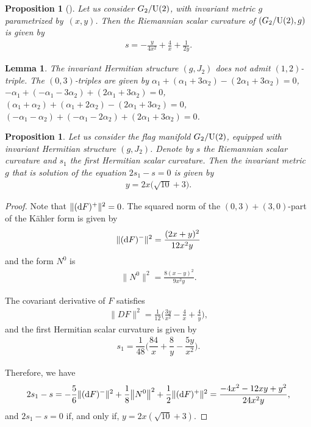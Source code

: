 \documentclass[10pt,a4paper]{amsart}
\numberwithin{equation}{section}
\newtheorem{Lemma}[Theorem]{Lemma}
\newtheorem{Proposition}[Theorem]{Proposition}
 { \theoremstyle{definition}
\newtheorem{Definition}[Theorem]{Definition}
\newtheorem{Question}[Theorem]{Question}
\newtheorem*{Notation}{Notation}
\newtheorem{Example}[Theorem]{Example}
\newtheorem{Remark}[Theorem]{Remark} }
\begin{document}
\begin{Proposition}[\cite{grego2}]
{\sloppy
Let us consider $G_{2}/{\rm U}(2)$, with invariant metric $g$ parametrized by~$(x,y)$. Then the Riemannian scalar curvature of $(G_{2}/{\rm U}(2),g)$ is given by
\begin{gather*}
s=-\frac{y}{4 x^2}+\frac{4}{x}+\frac{1}{2 y}.
\end{gather*}}
\end{Proposition}

\begin{Lemma}
The invariant Hermitian structure $(g, J_{2})$ does not admit $(1,2)$-triple. The $(0,3)$-triples are given by $\alpha_1+( \alpha_1+3\alpha_2) - ( 2\alpha_1+3\alpha_2)=0$, $-\alpha_1 + ( -\alpha_1-3\alpha_2)+(2\alpha_1+3\alpha_2)=0$, $(\alpha_1+\alpha_2) + ( \alpha_1+2\alpha_2)-(2\alpha_1+3\alpha_2)=0$, $( -\alpha_1-\alpha_2)+ ( -\alpha_1-2\alpha_2)+(2\alpha_1+3\alpha_2)=0$.
\end{Lemma}

\begin{Proposition}\label{prop-g2-j2}
Let us consider the flag manifold $G_{2}/{\rm U}(2)$, equipped with invariant Hermitian structure $(g, J_{2})$. Denote by $s$ the Riemannian scalar curvature and $s_1$ the first Hermitian scalar curvature. Then the invariant metric $g$ that is solution of the equation $2s_1-s=0$ is given by
 \begin{gather*}
y=2x\big(\sqrt{10} +3\big).
\end{gather*}
\end{Proposition}

\begin{proof}
Note that $\|({\rm d}F)^{+}\|^{2}=0$. The squared norm of the $(0,3)+(3,0)$-part of the K\"ahler form is given by
\begin{gather*}
\|({\rm d}F)^{-}\|^{2}=\frac{(2 x+y)^2}{12 x^2 y}
\end{gather*}
and the form $N^{0}$ is
\begin{gather*}
\big\|N^{0}\big\|^{2}=\frac{8 (x-y)^2}{9 x^2 y}.
\end{gather*}

The covariant derivative of $F$ satisfies
\begin{gather*}
\|DF\|^{2}=\frac{1}{12} \bigg(\frac{3 y}{x^2}-\frac{4}{x}+\frac{4}{y}\bigg),
\end{gather*}
and the first Hermitian scalar curvature is given by
\begin{gather*}
s_{1}=\dfrac{1}{48} \bigg(\dfrac{84}{x} + \dfrac{8}{y} - \dfrac{5 y}{x^2}\bigg).
\end{gather*}

Therefore, we have
\begin{align*}
2s_{1}-s=-\dfrac{5}{6}\|({\rm d}F)^{-}\|^{2}+\dfrac{1}{8}\big\|N^{0}\big\|^{2}+\dfrac{1}{2}\|({\rm d}F)^{+}\|^{2}
=\frac{-4 x^2-12 x y+y^2}{24 x^2 y},
\end{align*}
and $2s_{1}-s=0$ if, and only if, $y=2x (\sqrt{10}+3)$.
\end{proof}
\end{document}
